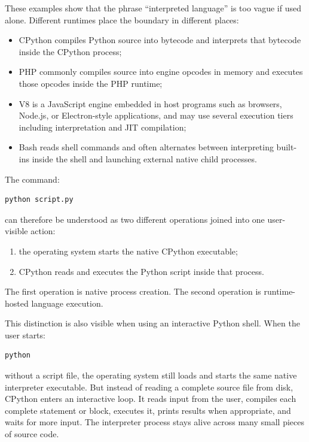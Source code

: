 \documentclass[a4paper,twoside]{report}
\begin{document}
These examples show that the phrase ``interpreted language'' is too vague if used alone. Different runtimes place the boundary in different places:

\begin{itemize}
    \item CPython compiles Python source into bytecode and interprets that bytecode inside the CPython process;
    \item PHP commonly compiles source into engine opcodes in memory and executes those opcodes inside the PHP runtime;
    \item V8 is a JavaScript engine embedded in host programs such as browsers, Node.js, or Electron-style applications, and may use several execution tiers including interpretation and JIT compilation;
    \item Bash reads shell commands and often alternates between interpreting built-ins inside the shell and launching external native child processes.
\end{itemize}

The command:

\begin{verbatim}
python script.py
\end{verbatim}

can therefore be understood as two different operations joined into one user-visible action:

\begin{enumerate}
    \item the operating system starts the native CPython executable;
    \item CPython reads and executes the Python script inside that process.
\end{enumerate}

The first operation is native process creation. The second operation is runtime-hosted language execution.

This distinction is also visible when using an interactive Python shell. When the user starts:

\begin{verbatim}
python
\end{verbatim}

without a script file, the operating system still loads and starts the same native interpreter executable. But instead of reading a complete source file from disk, CPython enters an interactive loop. It reads input from the user, compiles each complete statement or block, executes it, prints results when appropriate, and waits for more input. The interpreter process stays alive across many small pieces of source code.
\end{document}

